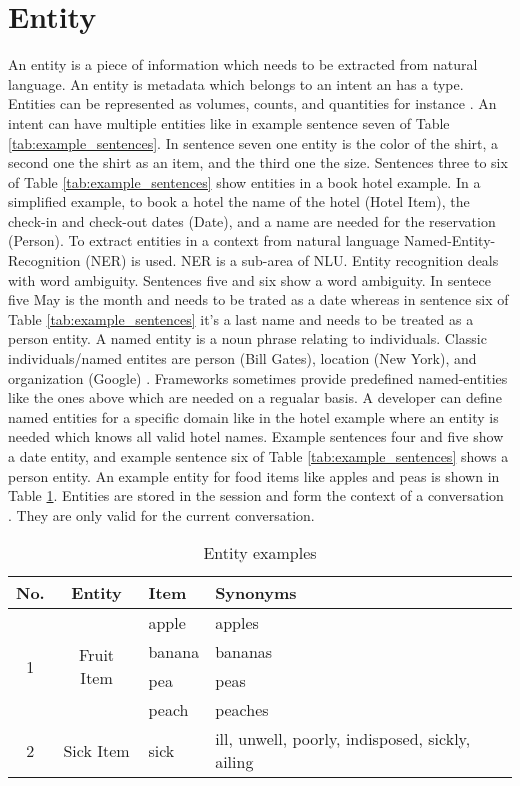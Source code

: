 \section{Entity} \label{sec:entity}
An entity is a piece of information which needs to be extracted from natural language.
An entity is metadata which belongs to an intent an has a type.
Entities can be represented as volumes, counts, and quantities for instance \cite{buiildChatbotsPython}.
An intent can have multiple entities like in example sentence seven of Table 
\ref{tab:example_sentences}.
In sentence seven one entity is the color of the shirt, 
a second one the shirt as an item, and the third one the size.
Sentences three to six of Table \ref{tab:example_sentences} show entities in a book hotel example.
In a simplified example, to book a hotel the name of the hotel (Hotel Item), 
the check-in and check-out dates (Date), 
and a name are needed for the reservation (Person).
To extract entities in a context from natural language Named-Entity-Recognition (NER) is used.
NER is a sub-area of NLU.
Entity recognition deals with word ambiguity.
Sentences five and six show a word ambiguity.
In sentece five May is the month and needs to be trated as a date whereas in sentence six of Table \ref{tab:example_sentences} 
it's a last name and needs to be treated as a person entity. 
A named entity is a noun phrase relating to individuals.
Classic individuals/named entites are person (Bill Gates), location (New York), and organization (Google) \cite{geyer2016named}.
Frameworks sometimes provide predefined named-entities like the ones above which are needed
on a regualar basis.
A developer can define named entities for a specific domain like in the hotel example where an 
entity is needed which knows all valid hotel names.
Example sentences four and five show a date entity,
and example sentence six of Table \ref{tab:example_sentences} shows a person entity.
An example entity for food items like apples and peas is shown in Table \ref{tab:entityexampledialog}.
Entities are stored in the session and form the context of a conversation \cite{singhbuilding}.
They are only valid for the current conversation.

\begin{table}[H]
    \centering
    \begin{tabular}{ c | c | l | l }
  No. & Entity & Item & Synonyms \\ \hline \hline
  \multirow{4}{*}{1} & \multirow{4}{*}{Fruit Item} & apple & apples \\
       & & banana & bananas\\
       & & pea & peas \\ 
       & & peach & peaches \\ \hline
    2 & Sick Item & sick & ill, unwell, poorly, indisposed, sickly, ailing \\
    \hline
\end{tabular}
    \caption{Entity examples} \label{tab:entityexampledialog}
\end{table} \noindent


